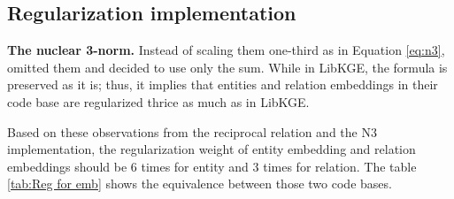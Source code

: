 \subsection{Regularization implementation}


\noindent\textbf{The nuclear 3-norm.} Instead of scaling them one-third as in Equation \ref{eq:n3}, \citet{chen2021relation} omitted them and decided to use only the sum. While in LibKGE, the formula is preserved as it is; thus, it implies that entities and relation embeddings in their code base are regularized thrice as much as in LibKGE.

Based on these observations from the reciprocal relation and the N3 implementation, the regularization weight of entity embedding and relation embeddings should be 6 times for entity and 3 times for relation. The table \ref{tab:Reg for emb} shows the equivalence between those two code bases.
\newline

\begin{table}[!htbp]
\centering
\caption{Equivalence of regularization weights in two codebases}
\label{tab:Reg for emb}
\end{table}


